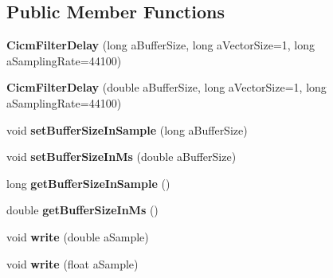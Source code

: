 \subsection*{Public Member Functions}
\begin{DoxyCompactItemize}
\item 
\hypertarget{class_cicm_filter_delay_acdd51be627a784a8db187090b5744ef9}{{\bfseries Cicm\-Filter\-Delay} (long a\-Buffer\-Size, long a\-Vector\-Size=1, long a\-Sampling\-Rate=44100)}\label{class_cicm_filter_delay_acdd51be627a784a8db187090b5744ef9}

\item 
\hypertarget{class_cicm_filter_delay_a83cd68b3c6b29b3fce048d670517101c}{{\bfseries Cicm\-Filter\-Delay} (double a\-Buffer\-Size, long a\-Vector\-Size=1, long a\-Sampling\-Rate=44100)}\label{class_cicm_filter_delay_a83cd68b3c6b29b3fce048d670517101c}

\item 
\hypertarget{class_cicm_filter_delay_acf93a578c768ce80347502057e57c8b9}{void {\bfseries set\-Buffer\-Size\-In\-Sample} (long a\-Buffer\-Size)}\label{class_cicm_filter_delay_acf93a578c768ce80347502057e57c8b9}

\item 
\hypertarget{class_cicm_filter_delay_a36faf062d0d2d29409c0fd92859f1e1c}{void {\bfseries set\-Buffer\-Size\-In\-Ms} (double a\-Buffer\-Size)}\label{class_cicm_filter_delay_a36faf062d0d2d29409c0fd92859f1e1c}

\item 
\hypertarget{class_cicm_filter_delay_a32d2548f7cc94877cb10ddb2514b9ece}{long {\bfseries get\-Buffer\-Size\-In\-Sample} ()}\label{class_cicm_filter_delay_a32d2548f7cc94877cb10ddb2514b9ece}

\item 
\hypertarget{class_cicm_filter_delay_a6d3e1a8e0ab560ff14fc86d7caf146fd}{double {\bfseries get\-Buffer\-Size\-In\-Ms} ()}\label{class_cicm_filter_delay_a6d3e1a8e0ab560ff14fc86d7caf146fd}

\item 
\hypertarget{class_cicm_filter_delay_a1c7461fba956439d052b880d1c811147}{void {\bfseries write} (double a\-Sample)}\label{class_cicm_filter_delay_a1c7461fba956439d052b880d1c811147}

\item 
\hypertarget{class_cicm_filter_delay_aaa2e21be0c488b79612c78f4fc8419c7}{void {\bfseries write} (float a\-Sample)}\label{class_cicm_filter_delay_aaa2e21be0c488b79612c78f4fc8419c7}


\end{DoxyCompactItemize}
